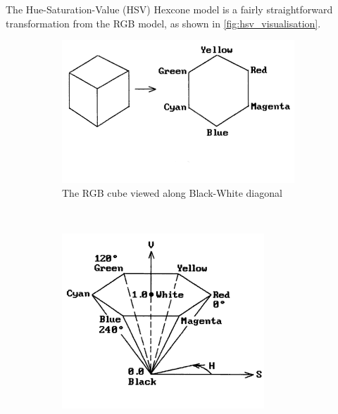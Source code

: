 \documentclass{report}
\begin{document}
The Hue-Saturation-Value (HSV) Hexcone model is a fairly straightforward transformation from the RGB model, as shown in \ref{fig:hsv_visualisation}.
\begin{figure}[hbtp]
        \centering
        \begin{subfigure}[b]{0.3\textwidth}
                \includegraphics[width=\textwidth]{graphics/hsv_cube.png}
                \caption{The RGB cube viewed along Black-White diagonal}
                \label{fig:gull}
        \end{subfigure}%
        ~
        \begin{subfigure}[b]{0.3\textwidth}
                \includegraphics[width=\textwidth]{graphics/hsv_rescale1.png}

\end{subfigure}
\end{figure}
\end{document}
